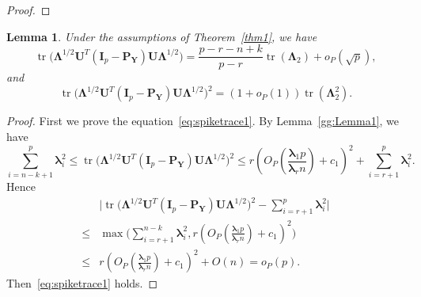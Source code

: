 \documentclass[12pt]{article} %
\DeclareMathOperator{\mytr}{tr}
\newcommand{\bP}{\mathbf{P}}
\newcommand{\bY}{\mathbf{Y}}
\newcommand{\bI}{\mathbf{I}}
\newcommand{\bU}{\mathbf{U}}
\newcommand{\bfsym}[1]{\ensuremath{\boldsymbol{#1}}}
\def\blambda {\bfsym {\lambda}}
\def\bLambda {\bfsym {\Lambda}}
\newtheorem{lemma}{Lemma}
\theoremstyle{definition}
\begin{document}
\begin{appendices}
\begin{proof}
\end{proof}
\begin{lemma}\label{gg:Lemma2}
    Under the assumptions of Theorem~\ref{thm1}, we have
    \begin{equation}\label{eq:spiketrace2}
        \mytr\big(\bLambda^{1/2} \bU^T (\bI_p-\bP_{\bY})\bU \bLambda^{1/2}\big)
= \frac{p-r-n+k}{p-r}\mytr(\bLambda_2)+o_P(\sqrt{p}),
\end{equation}
and
    \begin{equation}\label{eq:spiketrace1}
    \mytr\big(\bLambda^{1/2} \bU^T (\bI_p-\bP_{\bY})\bU \bLambda^{1/2}\big)^2 
 =(1+o_P(1))\mytr(\bLambda_2^2).
    \end{equation}
\end{lemma}
\begin{proof}
    First we prove the equation~\eqref{eq:spiketrace1}.
    By Lemma~\ref{gg:Lemma1}, we have
$$
    \sum_{i=n-k+1}^p \blambda_i^2\leq \mytr\big(\bLambda^{1/2} \bU^T (\bI_p-\bP_{\bY})\bU \bLambda^{1/2}\big)^2 \leq  r(O_P(\frac{\blambda_1 p}{\blambda_r n})+c_1)^2+\sum_{i=r+1}^p \blambda_i^2.
$$
    Hence
    \begin{equation*}
        \begin{aligned}
        &\big|\mytr\big(\bLambda^{1/2} \bU^T (\bI_p-\bP_{\bY})\bU \bLambda^{1/2}\big)^2 - \sum_{i=r+1}^p \blambda_i^2 \big|\\
        \leq &
            \max\Big(\sum_{i=r+1}^{n-k} \blambda_i^2 , r(O_P(\frac{\blambda_1 p}{\blambda_r n})+c_1)^2\Big)\\
        \leq &
            r(O_P(\frac{\blambda_1 p}{\blambda_r n})+c_1)^2+O(n)=o_P(p).
        \end{aligned}
    \end{equation*}
    Then~\eqref{eq:spiketrace1} holds.


\end{proof}
\end{appendices}
\end{document}
